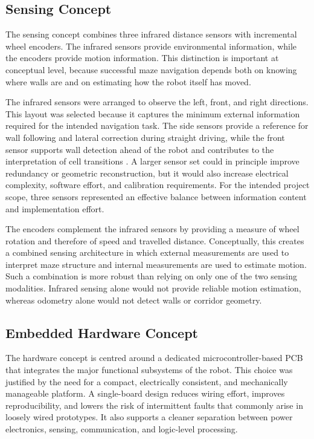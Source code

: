 \subsection{Sensing Concept}

The sensing concept combines three infrared distance sensors with incremental wheel encoders. The infrared sensors provide environmental information, while the encoders provide motion information. This distinction is important at conceptual level, because successful maze navigation depends both on knowing where walls are and on estimating how the robot itself has moved.

The infrared sensors were arranged to observe the left, front, and right directions. This layout was selected because it captures the minimum external information required for the intended navigation task. The side sensors provide a reference for wall following and lateral correction during straight driving, while the front sensor supports wall detection ahead of the robot and contributes to the interpretation of cell transitions \cite{datasheet_sensor}. A larger sensor set could in principle improve redundancy or geometric reconstruction, but it would also increase electrical complexity, software effort, and calibration requirements. For the intended project scope, three sensors represented an effective balance between information content and implementation effort.

The encoders complement the infrared sensors by providing a measure of wheel rotation and therefore of speed and travelled distance. Conceptually, this creates a combined sensing architecture in which external measurements are used to interpret maze structure and internal measurements are used to estimate motion. Such a combination is more robust than relying on only one of the two sensing modalities. Infrared sensing alone would not provide reliable motion estimation, whereas odometry alone would not detect walls or corridor geometry.

\subsection{Embedded Hardware Concept}

The hardware concept is centred around a dedicated microcontroller-based PCB that integrates the major functional subsystems of the robot. This choice was justified by the need for a compact, electrically consistent, and mechanically manageable platform. A single-board design reduces wiring effort, improves reproducibility, and lowers the risk of intermittent faults that commonly arise in loosely wired prototypes. It also supports a cleaner separation between power electronics, sensing, communication, and logic-level processing.

